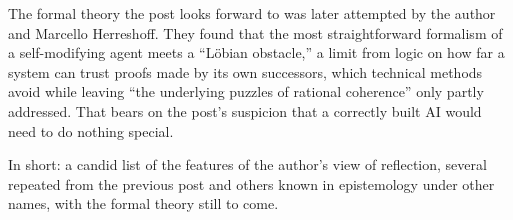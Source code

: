 \begin{afterword}
The formal theory the post looks forward to was later attempted by the author and Marcello Herreshoff. They found that the most straightforward formalism of a self-modifying agent meets a ``L\"obian obstacle,'' a limit from logic on how far a system can trust proofs made by its own successors, which technical methods avoid while leaving ``the underlying puzzles of rational coherence'' only partly addressed. That bears on the post's suspicion that a correctly built AI would need to do nothing special.

In short: a candid list of the features of the author's view of reflection, several repeated from the previous post and others known in epistemology under other names, with the formal theory still to come.
\end{afterword}
